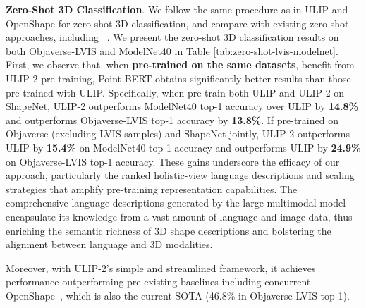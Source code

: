 \documentclass[10pt,twocolumn,letterpaper]{article}
\newcommand{\ning}[1]{\textcolor{blue}{Ning: #1}}
\begin{document}
\noindent\textbf{Zero-Shot 3D Classification}. We follow the same procedure as in ULIP and OpenShape for zero-shot 3D classification, and compare with existing zero-shot approaches, including ~\citep{xue2022ulip, liu2023openshape, zhang2022pointclip, Zhu2022PointCLIPV2, qi2023contrast, huang2022clip2point}. We present the zero-shot 3D classification results on both Objaverse-LVIS and ModelNet40 in Table \ref{tab:zero-shot-lvis-modelnet}. First, we observe that, when \textbf{pre-trained on the same datasets}, benefit from ULIP-2 pre-training, Point-BERT obtains significantly better results than those pre-trained with ULIP. Specifically, when pre-train both ULIP and ULIP-2 on ShapeNet, ULIP-2 outperforms ModelNet40 top-1 accuracy over ULIP by \textbf{14.8\%} and outperforms Objaverse-LVIS top-1 accuracy by \textbf{13.8\%}. If pre-trained on Objaverse (excluding LVIS samples) and ShapeNet jointly, ULIP-2 outperforms ULIP by \textbf{15.4\%} on ModelNet40 top-1 accuracy and outperforms ULIP by \textbf{24.9\%} on Objaverse-LVIS top-1 accuracy. These gains underscore the efficacy of our approach, particularly the ranked holistic-view language descriptions and scaling strategies that amplify pre-training representation capabilities. The comprehensive language descriptions generated by the large multimodal model encapsulate its knowledge from a vast amount of language and image data, thus enriching the semantic richness of 3D shape descriptions and bolstering the alignment between language and 3D modalities.

Moreover, with ULIP-2's simple and streamlined framework, it achieves performance outperforming pre-existing baselines including concurrent OpenShape~\citep{liu2023openshape}, which is also the current SOTA (46.8\% in Objaverse-LVIS top-1).





         
\end{document}
